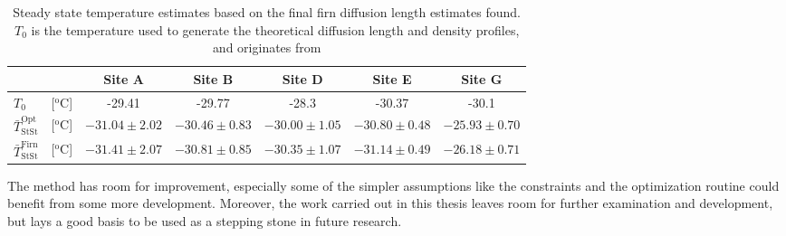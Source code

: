 \documentclass[../../CompleteThesis2/Complete_2ndDraft]{subfiles}
\begin{document}
\begin{table}[ht]
	\centering
	\begin{tabular}{l c|c|c|c|c|c}
		& & Site A & Site B & Site D & Site E & Site G \\
		\hline
		\hline
		$T_0$ & [$^{\text{o}}$C] & -29.41 & -29.77 & -28.3 & -30.37 & -30.1 \\[0.1cm]
		$\bar{T}_{\text{StSt}}^{\text{Opt}}$ & [$^{\text{o}}$C] & $-31.04 \pm 2.02$ & $-30.46 \pm 0.83$ & $-30.00 \pm 1.05$ & $-30.80 \pm 0.48$ & $-25.93 \pm 0.70$ \\[0.5cm]
		$\bar{T}_{\text{StSt}}^{\text{Firn}}$ & [$^{\text{o}}$C] & $-31.41 \pm 2.07$ & $-30.81 \pm 0.85$ & $-30.35 \pm 1.07$ & $-31.14 \pm 0.49$ & $-26.18 \pm 0.71$ \\[0.15cm]
	\end{tabular}
	\caption[Steady State Temperature Estimates]{\small Steady state temperature estimates based on the final firn diffusion length estimates found. $T_0$ is the temperature used to generate the theoretical diffusion length and density profiles, and originates from \cite[add. text]{keylist}}
	\label{Tab:TempResults}
\end{table}	

The method has room for improvement, especially some of the simpler assumptions like the constraints and the optimization routine could benefit from some more development. Moreover, the work carried out in this thesis leaves room for further examination and development, but lays a good basis to be used as a stepping stone in future research.
\end{document}
